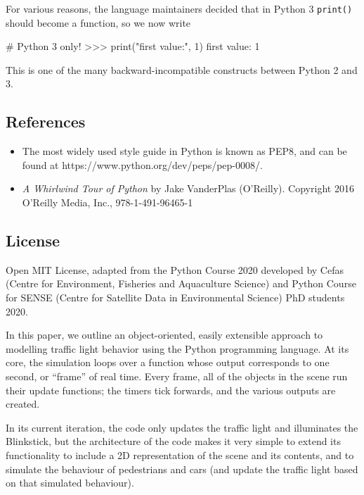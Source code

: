 \documentclass[
  letterpaper,
  DIV=11,
  numbers=noendperiod]{scrartcl}
\newenvironment{Shaded}{\begin{snugshade}}{\end{snugshade}}
\newcommand{\BuiltInTok}[1]{\textcolor[rgb]{0.00,0.23,0.31}{#1}}
\newcommand{\CommentTok}[1]{\textcolor[rgb]{0.37,0.37,0.37}{#1}}
\newcommand{\DecValTok}[1]{\textcolor[rgb]{0.68,0.00,0.00}{#1}}
\newcommand{\NormalTok}[1]{\textcolor[rgb]{0.00,0.23,0.31}{#1}}
\newcommand{\OperatorTok}[1]{\textcolor[rgb]{0.37,0.37,0.37}{#1}}
\newcommand{\StringTok}[1]{\textcolor[rgb]{0.13,0.47,0.30}{#1}}
\begin{document}
For various reasons, the language maintainers decided that in Python 3
\texttt{print()} should become a function, so we now write

\begin{Shaded}
\begin{Highlighting}[]
\CommentTok{\# Python 3 only!}
\OperatorTok{\textgreater{}\textgreater{}\textgreater{}} \BuiltInTok{print}\NormalTok{(}\StringTok{"first value:"}\NormalTok{, }\DecValTok{1}\NormalTok{)}
\NormalTok{first value: }\DecValTok{1}
\end{Highlighting}
\end{Shaded}

This is one of the many backward-incompatible constructs between Python
2 and 3.

\hypertarget{references}{%
\subsection{References}\label{references}}

\begin{itemize}
\item
  The most widely used style guide in Python is known as PEP8, and can
  be found at https://www.python.org/dev/peps/pep-0008/.
\item
  \emph{A Whirlwind Tour of Python} by Jake VanderPlas (O'Reilly).
  Copyright 2016 O'Reilly Media, Inc., 978-1-491-96465-1
\end{itemize}

\hypertarget{license}{%
\subsection{License}\label{license}}

Open MIT License, adapted from the Python Course 2020 developed by Cefas
(Centre for Environment, Fisheries and Aquaculture Science) and Python
Course for SENSE (Centre for Satellite Data in Environmental Science)
PhD students 2020.

In this paper, we outline an object-oriented, easily extensible approach
to modelling traffic light behavior using the Python programming
language. At its core, the simulation loops over a function whose output
corresponds to one second, or ``frame'' of real time. Every frame, all
of the objects in the scene run their update functions; the timers tick
forwards, and the various outputs are created.

In its current iteration, the code only updates the traffic light and
illuminates the Blinkstick, but the architecture of the code makes it
very simple to extend its functionality to include a 2D representation
of the scene and its contents, and to simulate the behaviour of
pedestrians and cars (and update the traffic light based on that
simulated behaviour).
\end{document}

